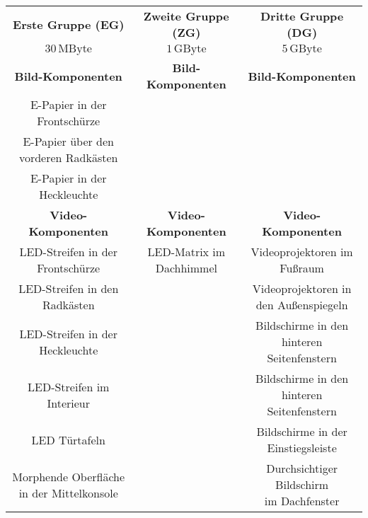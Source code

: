 \begin{table}[hbt]	
	\centering
	\renewcommand{\arraystretch}{1.5}	%
	\label{tab:Einteilung}
	\begin{tabular}{c|c|c}
		\textbf{Erste Gruppe (EG\nomenclature{EG}{Erste Gruppe})} & \textbf{Zweite Gruppe (ZG\nomenclature{ZG}{Zweite Gruppe})} & \textbf{Dritte Gruppe (DG\nomenclature{DG}{Dritte Gruppe})} \\ 
		$ 30\,\mathrm{MByte} $ & $ 1\,\mathrm{GByte} $ & $ 5\,\mathrm{GByte} $ \\
		\hline
		\hline
		\textbf{Bild-Komponenten} & \textbf{Bild-Komponenten} & \textbf{Bild-Komponenten} \\
		\parbox[t]{0.3\linewidth}{\centering E-Papier in der Frontschürze} &  &  \\
		\parbox[t]{0.3\linewidth}{\centering E-Papier über den vorderen Radkästen} &  & \\
		\parbox[t]{0.3\linewidth}{\centering E-Papier in der Heckleuchte} &  &  \\
		\textbf{Video-Komponenten} & \textbf{Video-Komponenten} & \textbf{Video-Komponenten} \\
		\parbox[t]{0.3\linewidth}{\centering LED-Streifen in der Frontschürze} & \parbox[t]{0.3\linewidth}{\centering LED-Matrix im Dachhimmel} & \parbox[t]{0.3\linewidth}{\centering Videoprojektoren im Fußraum} \\
		\parbox[t]{0.3\linewidth}{\centering LED-Streifen in den Radkästen} &  & \parbox[t]{0.3\linewidth}{\centering Videoprojektoren in\\den Außenspiegeln} \\ 
		\parbox[t]{0.3\linewidth}{\centering LED-Streifen in der Heckleuchte} &  & \parbox[t]{0.3\linewidth}{\centering Bildschirme in den\\hinteren Seitenfenstern} \\ 
		\parbox[t]{0.3\linewidth}{\centering LED-Streifen im Interieur} &  & \parbox[t]{0.3\linewidth}{\centering Bildschirme in den\\hinteren Seitenfenstern} \\
		\parbox[t]{0.3\linewidth}{\centering LED Türtafeln} & & \parbox[t]{0.3\linewidth}{\centering  Bildschirme in der Einstiegsleiste} \\
		\parbox[t]{0.3\linewidth}{\centering Morphende Oberfläche\\in der Mittelkonsole} & & \parbox[t]{0.3\linewidth}{\centering Durchsichtiger Bildschirm\\im Dachfenster} \\
	\end{tabular} 
\end{table}

